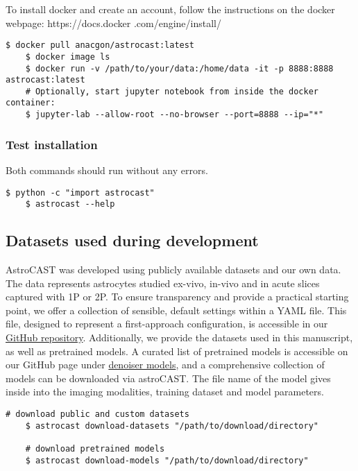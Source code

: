 To install docker and create an account, follow the instructions on the docker webpage: https://docs.docker
.com/engine/install/

\begin{lstlisting}[style=bashStyle]
    $ docker pull anacgon/astrocast:latest
    $ docker image ls
    $ docker run -v /path/to/your/data:/home/data -it -p 8888:8888 astrocast:latest
    # Optionally, start jupyter notebook from inside the docker container:
    $ jupyter-lab --allow-root --no-browser --port=8888 --ip="*"
\end{lstlisting}

\subsubsection{Test installation}

Both commands should run without any errors.

\begin{lstlisting}[style=bashStyle]
    $ python -c "import astrocast"
    $ astrocast --help
\end{lstlisting}

\subsection{Datasets used during development}
\label{ref:dataset-availability}

AstroCAST was developed using publicly available datasets and our own data. The data represents astrocytes studied ex-vivo, in-vivo and in acute slices captured with \ac{1P} or \ac{2P}. To ensure transparency and provide a practical starting point, we offer a collection of sensible, default settings within a YAML file. This file, designed to represent a first-approach configuration, is accessible in our \href{https://github.com/janreising/astroCAST}{GitHub repository}. Additionally, we provide the datasets used in this manuscript, as well as pretrained models. A curated list of pretrained models is accessible on our GitHub page under \href{https://github.com/janreising/astroCAST/tree/main/denoiser_models}{denoiser models}, and a comprehensive collection of models can be downloaded via astroCAST. The file name of the model gives inside into the imaging modalities, training dataset and model parameters.

\begin{lstlisting}[style=bashStyle]
    # download public and custom datasets
    $ astrocast download-datasets "/path/to/download/directory"

    # download pretrained models
    $ astrocast download-models "/path/to/download/directory"
\end{lstlisting}

